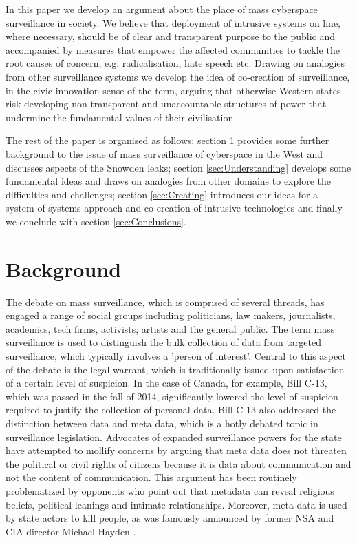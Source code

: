 \documentclass{llncs}
\begin{document}
In this paper we develop an argument about the place of mass cyberspace surveillance in society. We believe that deployment of intrusive systems on line, where necessary, should be of clear and transparent purpose to the public and accompanied by measures that empower the affected communities to tackle the root causes of concern, e.g. radicalisation, hate speech etc. Drawing on analogies from other surveillance systems we develop the idea of co-creation of surveillance, in the civic innovation sense of the term, arguing that otherwise Western states risk developing non-transparent and unaccountable structures of power that undermine the fundamental values of their civilisation.

The rest of the paper is organised as follows: section \ref{sec:Background} provides some further background to the issue of mass surveillance of cyberspace in the West and discusses aspects of the Snowden leaks; section \ref{sec:Understanding} develops some fundamental ideas and draws on analogies from other domains to explore the difficulties and challenges; section \ref{sec:Creating} introduces our ideas for a system-of-systems approach and co-creation of intrusive technologies and finally we conclude with section \ref{sec:Conclusions}.

\section{Background}
\label{sec:Background}
The debate on mass surveillance, which is comprised of several threads, has engaged a range of social groups including politicians, law makers, journalists, academics, tech firms, activists, artists and the general public. The term mass surveillance is used to distinguish the bulk collection of data from targeted surveillance, which typically involves a 'person of interest'. Central to this aspect of the debate is the legal warrant, which is traditionally issued upon satisfaction of a certain level of suspicion. In the case of Canada, for example, Bill C-13, which was passed in the fall of 2014, significantly lowered the level of suspicion required to justify the collection of personal data. Bill C-13 also addressed the distinction between data and meta data, which is a hotly debated topic in surveillance legislation. Advocates of expanded surveillance powers for the state have attempted to mollify concerns by arguing that meta data does not threaten the political or civil rights of citizens because it is data about communication and not the content of communication. This argument has been routinely problematized by opponents who point out that metadata can reveal religious beliefs, political leanings and intimate relationships. Moreover, meta data is used by state actors to kill people, as was famously announced by former NSA and CIA director Michael Hayden \cite{Hayden}. 
\end{document}
